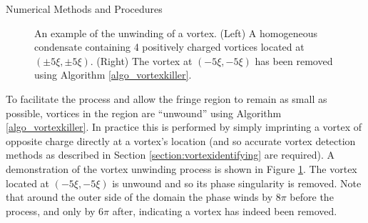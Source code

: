 \begin{chapter}{\label{cha:numerics}Numerical Methods and Procedures}
\begin{figure}
\begin{center}
\end{center}
  \caption{An example of the unwinding of a vortex. (Left) A homogeneous condensate containing 4 positively charged vortices located at $(\pm 5\xi,\pm 5\xi)$. (Right) The vortex at $(-5\xi,-5\xi)$ has been removed using Algorithm \ref{algo_vortexkiller}.}\label{fig:vortexunwind}
\end{figure}

To facilitate the process and allow the fringe region to remain as small as possible, vortices in the region are ``unwound'' using Algorithm \ref{algo_vortexkiller}. In practice this is performed by simply imprinting a vortex of opposite charge directly at a vortex's location (and so accurate vortex detection methods as described in Section \ref{section:vortexidentifying} are required). A demonstration of the vortex unwinding process is shown in Figure \ref{fig:vortexunwind}. The vortex located at $(-5\xi,-5\xi)$ is unwound and so its phase singularity is removed. Note that around the outer side of the domain the phase winds by $8\pi$ before the process, and only by $6\pi$ after, indicating a vortex has indeed been removed.


\end{chapter}
